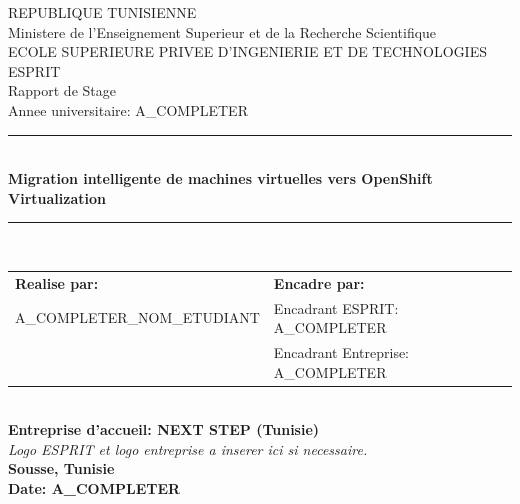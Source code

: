 ﻿\begin{titlepage}
\centering

{\Large REPUBLIQUE TUNISIENNE}\\[0.4cm]
{\large Ministere de l'Enseignement Superieur et de la Recherche Scientifique}\\[0.7cm]

{\Large ECOLE SUPERIEURE PRIVEE D'INGENIERIE ET DE TECHNOLOGIES}\\[0.2cm]
{\large ESPRIT}\\[1.0cm]

{\large Rapport de Stage}\\[0.3cm]
{\large Annee universitaire: A_COMPLETER}\\[1.0cm]

\rule{\textwidth}{0.6pt}\\[0.4cm]
{\LARGE \textbf{Migration intelligente de machines virtuelles vers OpenShift Virtualization}}\\[0.4cm]
\rule{\textwidth}{0.6pt}\\[1.0cm]

\begin{tabular}{p{} p{}}
\textbf{Realise par:} & \textbf{Encadre par:} \\
A_COMPLETER_NOM_ETUDIANT & Encadrant ESPRIT: A_COMPLETER \\
 & Encadrant Entreprise: A_COMPLETER \\
\end{tabular}\\[1.0cm]

\textbf{Entreprise d'accueil: NEXT STEP (Tunisie)}\\[1.0cm]

\textit{Logo ESPRIT et logo entreprise a inserer ici si necessaire.}\\[2.0cm]

\vfill
\textbf{Sousse, Tunisie}\\
\textbf{Date: A_COMPLETER}

\end{titlepage}
